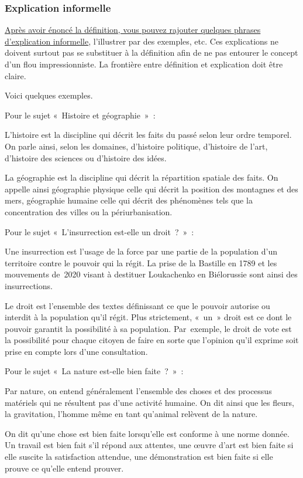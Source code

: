 \documentclass[a4paper,12pt]{article}
\begin{document}
\subsubsection{Explication informelle}
\label{sec:org909c748}

\uline{Après avoir énoncé la définition, vous pouvez rajouter quelques phrases
d'explication informelle}, l'illustrer par des exemples, etc. Ces
explications ne doivent surtout pas se substituer à la définition afin
de ne pas entourer le concept d'un flou impressionniste. La frontière
entre définition et explication doit être claire.

Voici quelques exemples.

Pour le sujet « Histoire et géographie » : 
\begin{QUOTATION}
L'histoire est la discipline qui décrit les faits
du passé selon leur ordre temporel. On parle
ainsi, selon les domaines, d'histoire politique,
d'histoire de l'art, d'histoire des sciences ou d'histoire des idées.

La géographie est la discipline qui décrit la
répartition spatiale des faits. On appelle ainsi
géographie physique celle qui décrit la position des montagnes et des
mers, géographie humaine celle qui décrit des phénomènes tels que la
concentration des villes ou la périurbanisation.
\end{QUOTATION}

Pour le sujet « L'insurrection est-elle un droit ? » : 
\begin{QUOTATION}
Une insurrection est l'usage de la force par une
partie de la population d'un territoire contre le pouvoir qui la régit.
La prise de la Bastille en 1789 et les mouvements
de 2020 visant à destituer Loukachenko en Biélorussie sont ainsi des
insurrections.

Le droit est l'ensemble des textes définissant ce
que le pouvoir autorise ou interdit à la population qu'il régit. Plus
strictement, « un » droit est ce dont le pouvoir garantit la possibilité
à sa population. Par exemple, le droit de vote
est la possibilité pour chaque citoyen de faire en sorte que l'opinion
qu'il exprime soit prise en compte lors d'une consultation.
\end{QUOTATION}

Pour le sujet « La nature est-elle bien faite ? » : 
\begin{QUOTATION}
Par nature, on entend généralement l'ensemble des
choses et des processus matériels qui ne résultent pas d'une activité
humaine. On dit ainsi que les fleurs, la
gravitation, l'homme même en tant qu'animal relèvent de la nature.

On dit qu'une chose est bien faite lorsqu'elle est
conforme à une norme donnée. Un travail est bien
fait s'il répond aux attentes, une œuvre d'art
est bien faite si elle suscite la satisfaction attendue, une
démonstration est bien faite si elle prouve ce qu'elle entend prouver.
\end{QUOTATION}
\end{document}
